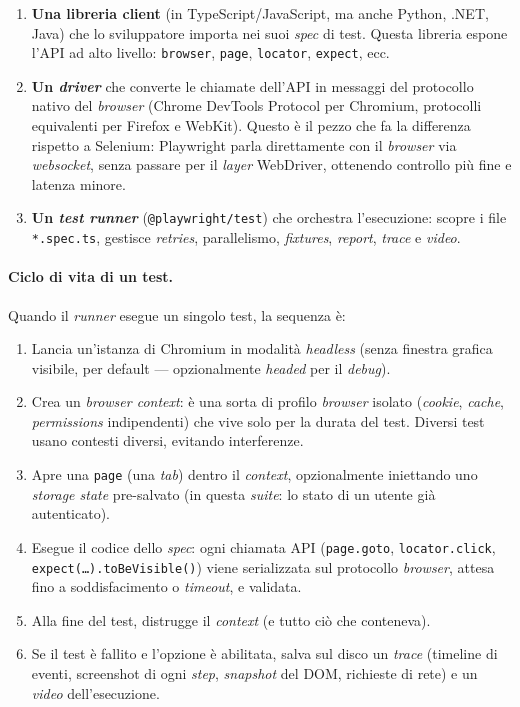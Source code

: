 \begin{enumerate}
    \item \textbf{Una libreria client} (in TypeScript/JavaScript, ma anche Python, .NET, Java) che lo sviluppatore importa nei suoi \emph{spec} di test. Questa libreria espone l'API ad alto livello: \texttt{browser}, \texttt{page}, \texttt{locator}, \texttt{expect}, ecc.
    \item \textbf{Un \emph{driver}} che converte le chiamate dell'API in messaggi del protocollo nativo del \emph{browser} (Chrome DevTools Protocol per Chromium, protocolli equivalenti per Firefox e WebKit). Questo è il pezzo che fa la differenza rispetto a Selenium: Playwright parla direttamente con il \emph{browser} via \emph{web\-socket}, senza passare per il \emph{layer} WebDriver, ottenendo controllo più fine e latenza minore.
    \item \textbf{Un \emph{test runner}} (\texttt{@playwright/test}) che orchestra l'esecuzione: scopre i file \texttt{*.spec.ts}, gestisce \emph{retries}, parallelismo, \emph{fixtures}, \emph{report}, \emph{trace} e \emph{video}.
\end{enumerate}

\paragraph{Ciclo di vita di un test.} Quando il \emph{runner} esegue un singolo test, la sequenza è:

\begin{enumerate}
    \item Lancia un'istanza di Chromium in modalità \emph{headless} (senza finestra grafica visibile, per default — opzionalmente \emph{headed} per il \emph{debug}).
    \item Crea un \emph{browser context}: è una sorta di profilo \emph{browser} isolato (\emph{cookie}, \emph{cache}, \emph{permissions} indipendenti) che vive solo per la durata del test. Diversi test usano contesti diversi, evitando interferenze.
    \item Apre una \texttt{page} (una \emph{tab}) dentro il \emph{context}, opzionalmente iniettando uno \emph{storage state} pre-salvato (in questa \emph{suite}: lo stato di un utente già autenticato).
    \item Esegue il codice dello \emph{spec}: ogni chiamata API (\texttt{page.goto}, \texttt{locator.click}, \texttt{expect(\dots).toBeVisible()}) viene serializzata sul protocollo \emph{browser}, attesa fino a soddisfacimento o \emph{timeout}, e validata.
    \item Alla fine del test, distrugge il \emph{context} (e tutto ciò che conteneva).
    \item Se il test è fallito e l'opzione è abilitata, salva sul disco un \emph{trace} (timeline di eventi, screenshot di ogni \emph{step}, \emph{snapshot} del DOM, richieste di rete) e un \emph{video} dell'esecuzione.
\end{enumerate}

